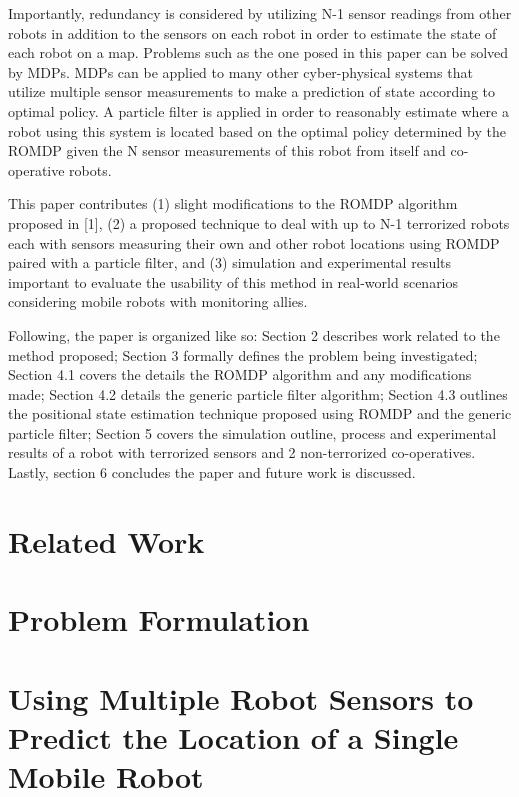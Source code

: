 \documentclass[conference]{IEEEtran}
\begin{document}
\par
Importantly, redundancy is considered by utilizing N-1 sensor readings from other robots in addition to the
sensors on each robot in order to estimate the state of each robot on a map. Problems such as the one posed
in this paper can be solved by MDPs. MDPs can be applied to many other cyber-physical systems that utilize
multiple sensor measurements to make a prediction of state according to optimal policy. A particle filter
is applied in order to reasonably estimate where a robot using this system is located based on the optimal
policy determined by the ROMDP given the N sensor measurements of this robot from itself and co-operative robots.
\par
This paper contributes (1) slight modifications to the ROMDP algorithm proposed in [1], (2) a proposed technique
to deal with up to N-1 terrorized robots each with sensors measuring their own and other robot locations
using ROMDP paired with a particle filter, and (3) simulation and experimental results important to evaluate
the usability of this method in real-world scenarios considering mobile robots with monitoring allies.
\par
Following, the paper is organized like so: Section 2 describes work related to the method proposed; Section 3
formally defines the problem being investigated; Section 4.1 covers the details the ROMDP algorithm and any
modifications made; Section 4.2 details the generic particle filter algorithm; Section 4.3 outlines the positional
state estimation technique proposed using ROMDP and the generic particle filter; Section 5 covers the
simulation outline, process and experimental results of a robot with terrorized sensors and 2 non-terrorized
co-operatives. Lastly, section 6 concludes the paper and future work is discussed.

\section{Related Work}


\section{Problem Formulation}



\section{Using Multiple Robot Sensors to Predict the Location of a Single Mobile Robot}
\end{document}
